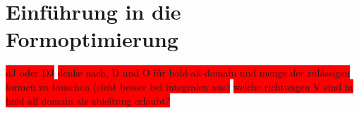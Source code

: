 


\section{Einführung in die Formoptimierung}
\label{Chapter_formopt}
\colorbox{red}{dJ oder DJ} \newline
\colorbox{red}{denke nach, D und O für hold-all-domain und menge der zulässigen formen zu tauschen (sieht besser bei integralen aus)} \newline
\colorbox{red}{welche richtungen V sind in hold all domain als ableitung erlaubt?}

